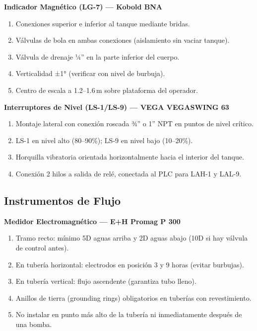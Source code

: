 \documentclass[12pt,letterpaper]{article}
\begin{document}
\textbf{Indicador Magnético (LG-7) — Kobold BNA}
\begin{enumerate}[leftmargin=1.5cm, label=\arabic*.]
  \item Conexiones superior e inferior al tanque mediante bridas.
  \item Válvulas de bola en ambas conexiones (aislamiento sin vaciar tanque).
  \item Válvula de drenaje ¼'' en la parte inferior del cuerpo.
  \item Verticalidad ±1° (verificar con nivel de burbuja).
  \item Centro de escala a 1.2--1.6\,m sobre plataforma del operador.
\end{enumerate}

\textbf{Interruptores de Nivel (LS-1/LS-9) — VEGA VEGASWING 63}
\begin{enumerate}[leftmargin=1.5cm, label=\arabic*.]
  \item Montaje lateral con conexión roscada ¾'' o 1'' NPT en puntos de nivel crítico.
  \item LS-1 en nivel alto (80--90\%); LS-9 en nivel bajo (10--20\%).
  \item Horquilla vibratoria orientada horizontalmente hacia el interior del tanque.
  \item Conexión 2 hilos a salida de relé, conectada al PLC para LAH-1 y LAL-9.
\end{enumerate}

\subsection{Instrumentos de Flujo}

\textbf{Medidor Electromagnético — E+H Promag P 300}
\begin{enumerate}[leftmargin=1.5cm, label=\arabic*.]
  \item Tramo recto: mínimo 5D aguas arriba y 2D aguas abajo (10D si hay válvula de control antes).
  \item En tubería horizontal: electrodos en posición 3 y 9 horas (evitar burbujas).
  \item En tubería vertical: flujo ascendente (garantiza tubo lleno).
  \item Anillos de tierra (grounding rings) obligatorios en tuberías con revestimiento.
  \item No instalar en punto más alto de la tubería ni inmediatamente después de una bomba.
\end{enumerate}
\end{document}
